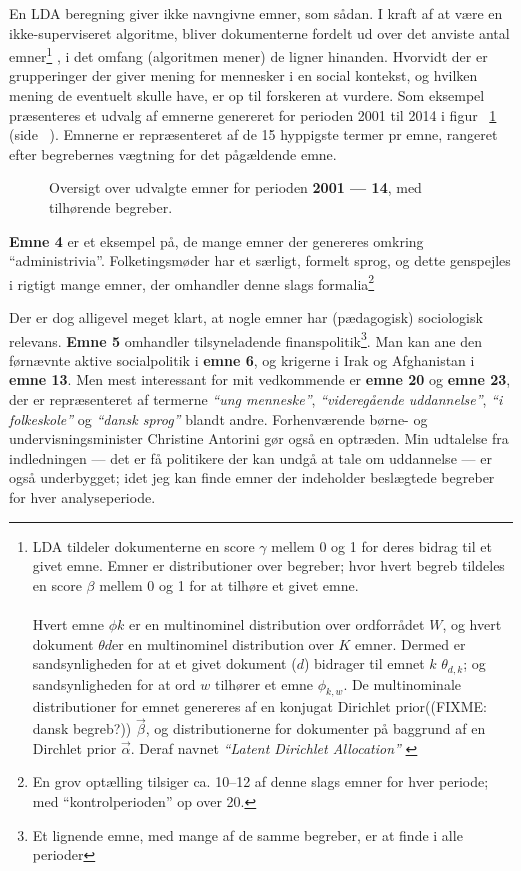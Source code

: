 En LDA beregning giver ikke navngivne emner, som sådan.
I kraft af at være en ikke-superviseret algoritme, bliver dokumenterne fordelt ud over det anviste antal emner\footnote{LDA tildeler dokumenterne en score $\gamma$ mellem 0 og 1 for deres bidrag til et givet emne. Emner er distributioner over begreber; hvor hvert begreb tildeles en score $\beta$ mellem 0 og 1 for at tilhøre et givet emne. \\ \\ Hvert emne $\phi k$ er en multinominel distribution over ordforrådet $W$, og hvert dokument $\theta d$er en multinominel distribution over $K$ emner. Dermed er sandsynligheden for at et givet dokument ($d$) bidrager til emnet $k$ $\theta _{d,k}$; og sandsynligheden for at ord $w$ tilhører et emne $\phi _{k,w}$. De multinominale distributioner for emnet genereres af en konjugat Dirichlet prior((FIXME: dansk begreb?)) $\overrightarrow{\beta}$, og distributionerne for dokumenter på baggrund af en Dirchlet prior $\overrightarrow{\alpha}$. Deraf navnet \textit{“Latent Dirichlet Allocation”} \autocite[s.65f]{deveaudAccurateEffectiveLatent2014}} , i det omfang (algoritmen mener) de ligner hinanden.
Hvorvidt der er grupperinger der giver mening for mennesker i en social kontekst, og hvilken mening de eventuelt skulle have, er op til forskeren at vurdere.
Som eksempel præsenteres et udvalg af emnerne genereret for perioden 2001 til 2014 i figur ~\ref{fig:termsFull} (side ~\pageref{fig:termsFull}).
Emnerne er repræsenteret af de 15 hyppigste termer pr emne, rangeret efter begrebernes vægtning for det pågældende emne.

\begin{figure}
\begin{adjustwidth}{-1in}{-1in}
 
\end{adjustwidth}
\caption{Oversigt over udvalgte emner for perioden \textbf{2001 --- 14}, med tilhørende begreber.}
\label{fig:termsFull}
\end{figure}

\textbf{Emne 4} er et eksempel på, de mange emner der genereres omkring “administrivia”.
Folketingsmøder har et særligt, formelt sprog, og dette genspejles i rigtigt mange emner, der omhandler denne slags formalia\footnote{En grov optælling tilsiger ca. 10--12 af denne slags emner for hver periode; med “kontrolperioden” op over 20.}

Der er dog alligevel meget klart, at nogle emner har (pædagogisk) sociologisk relevans.
\textbf{Emne 5} omhandler tilsyneladende finanspolitik\footnote{Et lignende emne, med mange af de samme begreber, er at finde i alle perioder}.
Man kan ane den førnævnte aktive socialpolitik i \textbf{emne 6}, og krigerne i Irak og Afghanistan i \textbf{emne 13}.
Men mest interessant for mit vedkommende er \textbf{emne 20} og \textbf{emne 23}, der er repræsenteret af termerne \textit{“ung menneske”}, \textit{“videregående uddannelse”}, \textit{“i folkeskole”} og \textit{“dansk sprog”} blandt andre.
Forhenværende børne- og undervisningsminister Christine Antorini gør også en optræden.
Min udtalelse fra indledningen --- det er få politikere der kan undgå at tale om uddannelse — er også underbygget; idet jeg kan finde emner der indeholder beslægtede begreber for hver analyseperiode.

